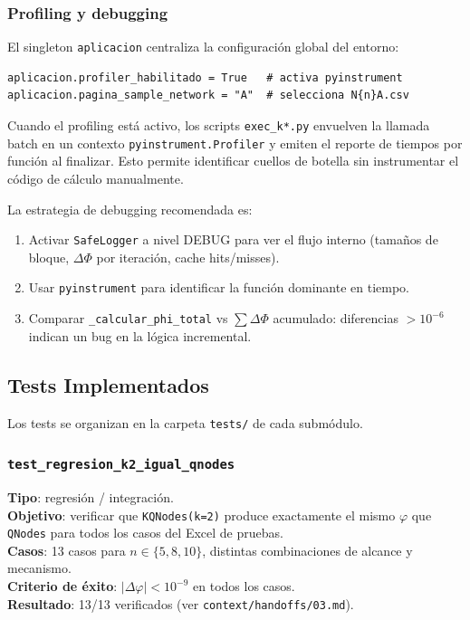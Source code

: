 \subsubsection*{Profiling y debugging}

El singleton \texttt{aplicacion} centraliza la configuración global del entorno:

\begin{lstlisting}
aplicacion.profiler_habilitado = True   # activa pyinstrument
aplicacion.pagina_sample_network = "A"  # selecciona N{n}A.csv
\end{lstlisting}

Cuando el profiling está activo, los scripts \texttt{exec\_k*.py} envuelven
la llamada batch en un contexto \texttt{pyinstrument.Profiler} y emiten el
reporte de tiempos por función al finalizar. Esto permite identificar cuellos
de botella sin instrumentar el código de cálculo manualmente.

La estrategia de debugging recomendada es:
\begin{enumerate}
  \item Activar \texttt{SafeLogger} a nivel DEBUG para ver el flujo interno
        (tamaños de bloque, $\Delta\Phi$ por iteración, cache hits/misses).
  \item Usar \texttt{pyinstrument} para identificar la función dominante en tiempo.
  \item Comparar \texttt{\_calcular\_phi\_total} vs $\sum \Delta\Phi$ acumulado:
        diferencias $> 10^{-6}$ indican un bug en la lógica incremental.
\end{enumerate}

\subsection{Tests Implementados}

Los tests se organizan en la carpeta \texttt{tests/} de cada submódulo.

\subsubsection*{\texttt{test\_regresion\_k2\_igual\_qnodes}}

\textbf{Tipo}: regresión / integración. \\
\textbf{Objetivo}: verificar que \texttt{KQNodes(k=2)} produce exactamente el
mismo $\varphi$ que \texttt{QNodes} para todos los casos del Excel de pruebas. \\
\textbf{Casos}: 13 casos para $n \in \{5, 8, 10\}$, distintas combinaciones de
alcance y mecanismo. \\
\textbf{Criterio de éxito}: $|\Delta\varphi| < 10^{-9}$ en todos los casos. \\
\textbf{Resultado}: 13/13 verificados (ver \texttt{context/handoffs/03.md}).

